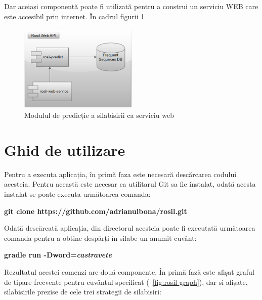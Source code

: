 Dar aceiași componentă poate fi utilizată pentru a construi un serviciu WEB care este accesibil prin internet. În cadrul figurii \ref{fig:rosil-service}

\begin{figure}[h!]
    \centering
    \includegraphics[width=0.50\textwidth]{figures/rosil-service.png}
    \caption{Modulul de predicție a silabisirii ca serviciu web}
    \label{fig:rosil-service}
\end{figure}

\section{Ghid de utilizare}

Pentru a executa aplicația, în primă faza este necesară descărcarea codului acesteia. Pentru această este necesar ca utilitarul Git sa fie instalat, odată acesta instalat se poate executa următoarea comanda:

\begin{center}
\textbf{git clone https://github.com/adrianulbona/rosil.git}
\end{center} 

Odată descărcată aplicația, din directorul acesteia poate fi executată următoarea comanda pentru a obtine despărți în silabe un anumit cuvânt:

\begin{center}
\textbf{gradle run -Dword=\textit{castravete}}
\end{center} 

Rezultatul acestei comenzi are două componente. În primă fază este afișat graful de tipare frecvente pentru cuvântul specificat (~\ref{fig:rosil-graph}), dar si afișate, silabisirile prezise de cele trei strategii de silabisiri:

